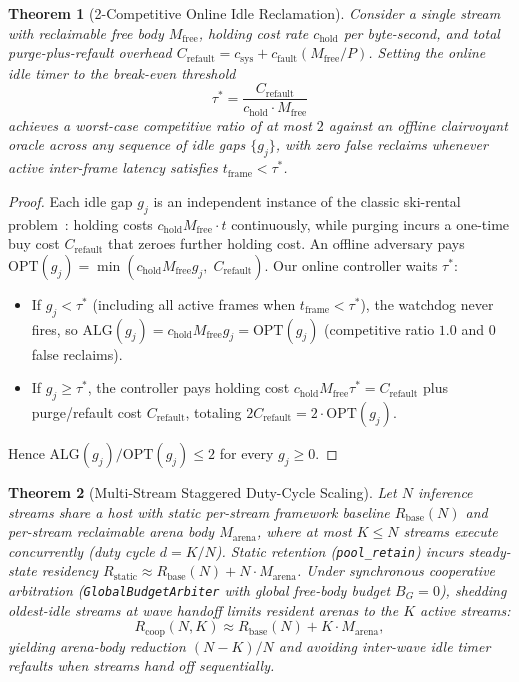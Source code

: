 \documentclass[sigconf,screen]{acmart}
\newtheorem{theorem}{Theorem}
\begin{document}
\begin{theorem}[2-Competitive Online Idle Reclamation]
\label{thm:competitive}
Consider a single stream with reclaimable free body $M_{\text{free}}$, holding cost rate $c_{\text{hold}}$ per byte-second, and total purge-plus-refault overhead $C_{\text{refault}} = c_{\text{sys}} + c_{\text{fault}}(M_{\text{free}}/P)$. Setting the online idle timer to the break-even threshold
\begin{equation}
  \tau^* = \frac{C_{\text{refault}}}{c_{\text{hold}} \cdot M_{\text{free}}}
\end{equation}
achieves a worst-case competitive ratio of at most $2$ against an offline clairvoyant oracle across any sequence of idle gaps $\{g_j\}$, with zero false reclaims whenever active inter-frame latency satisfies $t_{\text{frame}} < \tau^*$.
\end{theorem}

\begin{proof}
Each idle gap $g_j$ is an independent instance of the classic ski-rental problem~\cite{karlin1994competitive}: holding costs $c_{\text{hold}} M_{\text{free}} \cdot t$ continuously, while purging incurs a one-time buy cost $C_{\text{refault}}$ that zeroes further holding cost. An offline adversary pays $\text{OPT}(g_j) = \min(c_{\text{hold}} M_{\text{free}} g_j,\; C_{\text{refault}})$. Our online controller waits $\tau^*$:
\begin{itemize}
  \item If $g_j < \tau^*$ (including all active frames when $t_{\text{frame}} < \tau^*$), the watchdog never fires, so $\text{ALG}(g_j) = c_{\text{hold}} M_{\text{free}} g_j = \text{OPT}(g_j)$ (competitive ratio $1.0$ and $0$ false reclaims).
  \item If $g_j \ge \tau^*$, the controller pays holding cost $c_{\text{hold}} M_{\text{free}} \tau^* = C_{\text{refault}}$ plus purge/refault cost $C_{\text{refault}}$, totaling $2 C_{\text{refault}} = 2 \cdot \text{OPT}(g_j)$.
\end{itemize}
Hence $\text{ALG}(g_j) / \text{OPT}(g_j) \le 2$ for every $g_j \ge 0$.
\end{proof}

\begin{theorem}[Multi-Stream Staggered Duty-Cycle Scaling]
\label{thm:multicam}
Let $N$ inference streams share a host with static per-stream framework baseline $R_{\text{base}}(N)$ and per-stream reclaimable arena body $M_{\text{arena}}$, where at most $K \le N$ streams execute concurrently (duty cycle $d = K/N$). Static retention (\texttt{pool\_retain}) incurs steady-state residency $R_{\text{static}} \approx R_{\text{base}}(N) + N \cdot M_{\text{arena}}$. Under synchronous cooperative arbitration (\texttt{GlobalBudgetArbiter} with global free-body budget $B_G = 0$), shedding oldest-idle streams at wave handoff limits resident arenas to the $K$ active streams:
\begin{equation}
  R_{\text{coop}}(N, K) \approx R_{\text{base}}(N) + K \cdot M_{\text{arena}},
\end{equation}
yielding arena-body reduction $(N-K)/N$ and avoiding inter-wave idle timer refaults when streams hand off sequentially.
\end{theorem}
\end{document}
